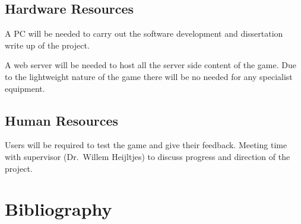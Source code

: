 \documentclass[12pt,a4paper]{report}
\begin{document}
\section{Hardware Resources}
A PC will be needed to carry out the software development and dissertation write up of the project. 

A web server will be needed to host all the server side content of the game. Due to the lightweight nature of the game there will be no needed for any specialist equipment.

\section{Human Resources}
Users will be required to test the game and give their feedback. 
Meeting time with supervisor (Dr.~Willem Heijltjes) to discuss progress and direction of the project.
\chapter{Bibliography}%
\end{document}
